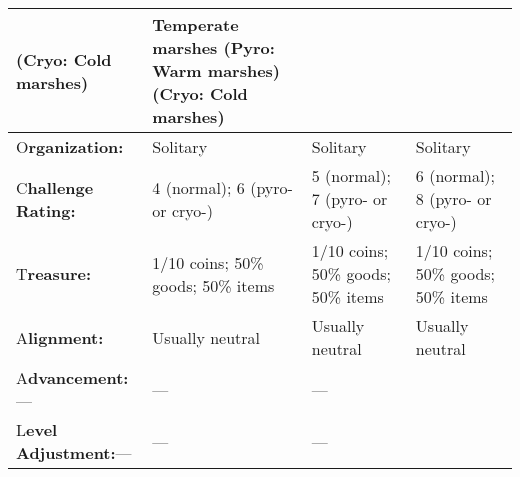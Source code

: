 \documentclass{article}
\begin{document}
\begin{tabular}{|>{\raggedright}p{52pt}|>{\raggedright}p{83pt}|>{\raggedright}p{83pt}|>{\raggedright}p{83pt}|}
(Cryo: Cold marshes) & Temperate marshes \linebreak{}
(Pyro: Warm marshes) \linebreak{}
(Cryo: Cold marshes)\tabularnewline
\hline
O\textbf{rganization:} & Solitary & Solitary & Solitary\tabularnewline
\hline
C\textbf{hallenge Rating:} & 4 (normal); \linebreak{}
6 (pyro- or cryo-) & 5 (normal); \linebreak{}
7 (pyro- or cryo-) & 6 (normal); \linebreak{}
8 (pyro- or cryo-)\tabularnewline
\hline
T\textbf{reasure:} & 1/10 coins; 50\% goods; 50\% items & 1/10 coins; 50\% goods; 
50\% items & 1/10 coins; 50\% goods; 50\% items\tabularnewline
\hline
A\textbf{lignment:} & Usually neutral & Usually neutral & Usually neutral\tabularnewline
\hline
A\textbf{dvancement:}--- & --- & --- & \tabularnewline
\hline
L\textbf{evel Adjustment:}--- & --- & --- & \tabularnewline
\hline
\end{tabular}
\end{document}
